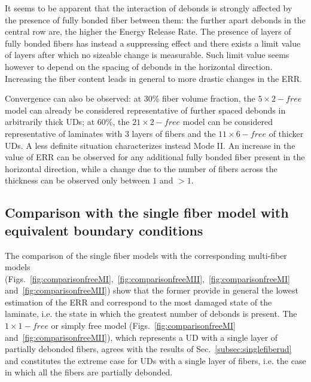 \documentclass[review]{elsarticle}
\begin{document}
It seems to be apparent that the interaction of debonds is strongly affected by the presence of fully bonded fiber between them: the further apart debonds in the central row are, the higher the Energy Release Rate. The presence of layers of fully bonded fibers has instead a suppressing effect and there exists a limit value of layers after which no sizeable change is measurable. Such limit value seems however to depend on the spacing of debonds in the horizontal direction. Increasing the fiber content leads in general to more drastic changes in the ERR.

Convergence can also be observed: at $30\%$ fiber volume fraction, the $5\times 2-free$ model can already be considered representative of further spaced debonds in arbitrarily thick UDs; at $60\%$, the $21\times 2-free$ model can be considered representative of laminates with 3 layers of fibers and the $11\times 6-free$ of thicker UDs. A less definite situation characterizes instead Mode II. An increase in the value of ERR can be observed for any additional fully bonded fiber present in the horizontal direction, while a change due to the number of fibers across the thickness can be observed only between $1$ and $>1$.

\subsection{Comparison with the single fiber model with equivalent boundary conditions}

The comparison of the single fiber models with the corresponding multi-fiber models (Figs.~\ref{fig:comparisonfreeMI},~\ref{fig:comparisonfreeMII},~\ref{fig:comparisonfreeMI} and~\ref{fig:comparisonfreeMII}) show that the former provide in general the lowest estimation of the ERR and correspond to the most damaged state of the laminate, i.e. the state in which the greatest number of debonds is present. The $1\times 1-free$ or simply free model (Figs.~\ref{fig:comparisonfreeMI} and~\ref{fig:comparisonfreeMII}), which represents a UD with a single layer of partially debonded fibers, agrees with the results of Sec.~\ref{subsec:singlefiberud} and constitutes the extreme case for UDs with a single layer of fibers, i.e. the case in which all the fibers are partially debonded.
\end{document}
